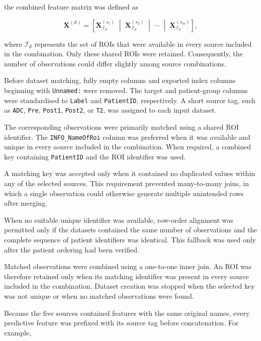 \documentclass[12pt,twocolumn]{article}
\begin{document}
the combined feature matrix was defined as

\begin{equation}
\mathbf{X}^{(\mathcal{S})}
=
\left[
\mathbf{X}^{(s_1)}_{\mathcal{I}_{\mathcal{S}}}
\;\middle|\;
\mathbf{X}^{(s_2)}_{\mathcal{I}_{\mathcal{S}}}
\;\middle|\;
\cdots
\;\middle|\;
\mathbf{X}^{(s_m)}_{\mathcal{I}_{\mathcal{S}}}
\right],
\label{eq:multisource_concatenation}
\end{equation}

where \(\mathcal{I}_{\mathcal{S}}\) represents the set of ROIs that
were available in every source included in the combination. Only
these shared ROIs were retained. Consequently, the number of
observations could differ slightly among source combinations.

Before dataset matching, fully empty columns and exported index
columns beginning with \texttt{Unnamed:} were removed. The target
and patient-group columns were standardised to \texttt{Label} and
\texttt{PatientID}, respectively. A short source tag, such as
\texttt{ADC}, \texttt{Pre}, \texttt{Post1}, \texttt{Post2}, or
\texttt{T2}, was assigned to each input dataset.

The corresponding observations were primarily matched using a
shared ROI identifier. The \texttt{INFO\_NameOfRoi} column was
preferred when it was available and unique in every source included
in the combination. When required, a combined key containing
\texttt{PatientID} and the ROI identifier was used.

A matching key was accepted only when it contained no duplicated
values within any of the selected sources. This requirement prevented
many-to-many joins, in which a single observation could otherwise
generate multiple unintended rows after merging.

When no suitable unique identifier was available, row-order
alignment was permitted only if the datasets contained the same
number of observations and the complete sequence of patient
identifiers was identical. This fallback was used only after the
patient ordering had been verified.

Matched observations were combined using a one-to-one inner join.
An ROI was therefore retained only when its matching identifier was
present in every source included in the combination. Dataset creation
was stopped when the selected key was not unique or when no matched
observations were found.

Because the five sources contained features with the same original
names, every predictive feature was prefixed with its source tag
before concatenation. For example,
\end{document}
